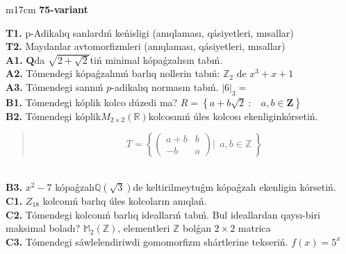 \documentclass{article}
\begin{document}
\begin{tabular}{m{17cm}}
\textbf{75-variant}
\newline

\textbf{T1.} p-Adikalıq sanlardıń keńisligi (anıqlaması, qásiyetleri, mısallar) \\
\textbf{T2.} Maydanlar avtomorfizmleri (anıqlaması, qásiyetleri, mısallar) \\
\textbf{A1.} \(\mathbf{Q}\)da \(\sqrt{2 + \sqrt{2}}\)tiń minimal kópaǵzalısın tabıń. \\
\textbf{A2.} Tómendegi kópaǵzalınıń barlıq nollerin tabıń: \(\mathbb{Z}_{2}\) de \(x^{3} + x + 1\) \\
\textbf{A3.} Tómendegi sannıń \(p\)-adikalıq normasın tabıń. \(|6|_{3} =\) \\
\textbf{B1.} Tómendegi kóplik kolco dúzedi ma? \(R = \left\{ a + b\sqrt{2}\ :\ \ \ \ a,b \in \mathbf{Z} \right\}\) \\
\textbf{B2.} Tómendegi kóplik\(M_{2 \times 2}\left( \mathbb{R} \right)\)kolcosınıń úles kolcosı ekenliginkórsetiń.
\begin{quote}
\[T = \left\{ \begin{pmatrix}
a + b & b \\
 - b & a
\end{pmatrix}\left| \ \ a,b\mathbb{\in Z} \right.\  \right\}\]
\end{quote} \\
\textbf{B3.} \(x^{2} - 7\) kópaǵzalı\(\mathbb{Q}(\sqrt{3})\)de keltirilmeytuǵın kópaǵzalı ekenligin kórsetiń. \\
\textbf{C1.} \(Z_{18}\) kolconıń barlıq úles kolcoların anıqlań. \\
\textbf{C2.} Tómendegi kolconıń barlıq ideallarıń tabıń. Bul ideallardan qaysı-biri maksimal boladı? \(\mathbb{M}_{2}\left( \mathbb{Z} \right)\), elementleri \(\mathbb{Z}\) bolǵan \(2 \times 2\) matrica \\
\textbf{C3.} Tómendegi sáwlelendiriwdi gomomorfizm shártlerine tekseriń. \(f(x) = 5^{x}\) \\

\end{tabular}
\vspace{1cm}
\end{document}
